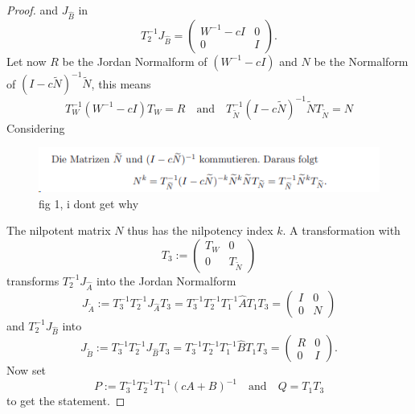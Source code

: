 \begin{proof}
	and $J_{\hat{B}}$ in
	\begin{displaymath}
		T_2^{-1}J_{\hat{B}} =
		\left(
		\begin{matrix}
			W^{-1}-cI & 0 \\
			0 & I
		\end{matrix}
		\right) .
	\end{displaymath}
	Let now $R$ be the Jordan Normalform of $(W^{-1}-cI)$ and $N$ be the Normalform of $(I-c\tilde{N})^{-1}\tilde{N}$, this means
	\begin{displaymath}
		T_W^{-1}(W^{-1}-cI)T_W = R \quad \text{and} \quad T_{\tilde{N}}^{-1}(I-c\tilde{N})^{-1}\tilde{N}T_{\tilde{N}} = N
	\end{displaymath}
	Considering
	
	\begin{figure}[H]
		\centering
		\includegraphics[width=0.7\linewidth]{screenshot001}
		\caption{fig 1, i dont get why}
		\label{fig:screenshot001}
	\end{figure}
	
	
	The nilpotent matrix $N$ thus has the nilpotency index $k$. A transformation with
	\begin{displaymath}
		T_3 := 
		\left(
		\begin{matrix}
			T_W & 0 \\
			0 & T_{\tilde{N}}
		\end{matrix}
		\right)
	\end{displaymath}
	transforms $T_2^{-1}J_{\hat{A}}$ into the Jordan Normalform
	\begin{displaymath}
		J_{\tilde{A}} := T_3^{-1}T_2^{-1}J_{\hat{A}}T_3 = T_3^{-1}T_2^{-1}T_1^{-1}\hat{A}T_1T_3 = 
		\left(
		\begin{matrix}
			I & 0 \\
			0 & N
		\end{matrix}
		\right)
	\end{displaymath}
	and $T_2^{-1}J_{\hat{B}}$ into
	\begin{displaymath}
		J_{\tilde{B}} := T_3^{-1}T_2^{-1}J_{\hat{B}}T_3 = T_3^{-1}T_2^{-1}T_1^{-1}\hat{B}T_1T_3 = 
		\left(
		\begin{matrix}
			R & 0 \\
			0 & I
		\end{matrix}
		\right) .
	\end{displaymath}
	Now set
	\begin{displaymath}
		P:= T_3^{-1}T_2^{-1}T_1^{-1}(cA+B)^{-1} \quad \text{and} \quad Q = T_1T_3
	\end{displaymath}
	to get the statement.
\end{proof}

